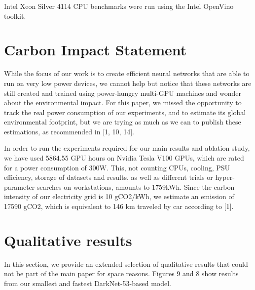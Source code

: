 \documentclass[10pt,twocolumn,letterpaper]{article}
\begin{document}
Intel Xeon Silver 4114 CPU benchmarks were run using
the Intel OpenVino toolkit.

\section{Carbon Impact Statement}

While the focus of our work is to create efficient neural
networks that are able to run on very low power devices, we
cannot help but notice that these networks are still created
and trained using power-hungry multi-GPU machines and
wonder about the environmental impact. For this paper, we
missed the opportunity to track the real power consumption
of our experiments, and to estimate its global environmental
footprint, but we are trying as much as we can to publish
these estimations, as recommended in [1, 10, 14].

In order to run the experiments required for our main results
and ablation study, we have used 5864.55 GPU hours
on Nvidia Tesla V100 GPUs, which are rated for a power
consumption of 300W. This, not counting CPUs, cooling,
PSU efficiency, storage of datasets and results, as well as
different trials or hyper-parameter searches on workstations,
amounts to 1759kWh. Since the carbon intensity of our
electricity grid is 10 gCO2/kWh, we estimate an emission
of 17590 gCO2, which is equivalent to 146 km traveled by
car according to [1].

\section{Qualitative results}

In this section, we provide an extended selection of qualitative
results that could not be part of the main paper for
space reasons. Figures 9 and 8 show results from our smallest
and fastest DarkNet-53-based model.
\end{document}
